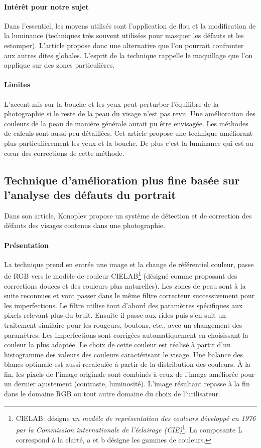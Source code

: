 \documentclass[11pt, french,screen]{report-rd-info}
\begin{document}
\paragraph{Intérêt pour notre sujet}
Dans l’essentiel, les moyens utilisés sont l’application de flou et la modification de la luminance (techniques très souvent utilisées pour masquer les défauts et les estomper). L’article propose donc une alternative que l’on pourrait confronter aux autres dites globales. L’esprit de la technique rappelle le maquillage que l’on applique sur des zones particulières.
\paragraph{Limites}
L’accent mis sur la bouche et les yeux peut perturber l’équilibre de la photographie si le reste de la peau du visage n’est pas revu. Une amélioration des couleurs de la peau de manière générale aurait pu être envisagée. Les méthodes de calculs sont aussi peu détaillées.
Cet article propose une technique améliorant plus particulièrement les yeux et la bouche. De plus c’est la luminance qui est au cœur des corrections de cette méthode.
\subsection{Technique d’amélioration plus fine basée sur l’analyse des défauts du portrait}
Dans son article, Konoplev \cite{Konoplev2012} propose un système de détection et de correction des défauts des visages contenus dans une photographie.
\paragraph{Présentation}
La technique prend en entrée une image et la change de référentiel couleur, passe de RGB vers le modèle de couleur CIELAB\footnote{CIELAB: désigne \textit{un modèle de représentation des couleurs développé en 1976 par la Commission internationale de l'éclairage (CIE)}\footnote{Wikipédia, CIELab,http://fr.wikipedia.org/wiki/CIE\_Lab}. La composante L correspond à la clarté, a et b désigne les gammes de couleurs.} (désigné comme proposant des corrections douces et des couleurs plus naturelles). Les zones de peau sont à la suite reconnues et vont passer dans le même filtre correcteur successivement pour les imperfections. Le filtre utilise tout d'abord des paramètres spécifiques aux pixels relevant plus du bruit. Ensuite il passe aux rides puis s'en suit un traitement similaire pour les rougeurs, boutons, etc., avec un changement des paramètres. Les imperfections sont corrigées automatiquement en choisissant la couleur la plus adaptée. Le choix de cette couleur est réalisé à partir d’un histogramme des valeurs des couleurs caractérisant le visage. Une balance des blancs optimale est aussi recalculée à partir de la distribution des couleurs. À la fin, les pixels de l’image originale sont combinés à ceux de l’image améliorée pour un dernier ajustement (contraste, luminosité). L'image résultant repasse à la fin dans le domaine RGB ou tout autre domaine du choix de l’utilisateur.
\end{document}

